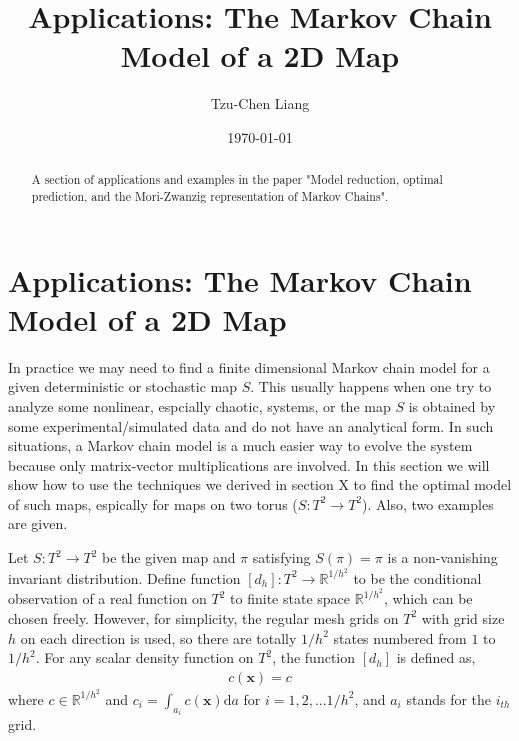 \documentclass{article}
\title{Applications: The Markov Chain Model of a 2D Map}
\author{Tzu-Chen Liang}
\date{\today}
\begin{document}
\maketitle
\begin{abstract}
A section of applications and examples in the paper "Model reduction, optimal prediction, and the Mori-Zwanzig representation of Markov Chains".
\end{abstract}



\section{Applications: The Markov Chain Model of a 2D Map}

In practice we may need to find a finite dimensional Markov chain model for a given deterministic or stochastic map $S$. This usually happens when one try to analyze some nonlinear, espcially chaotic, systems, or the map $S$ is obtained by some experimental/simulated data and do not have an analytical form. In such situations, a Markov chain model is a much easier way to evolve the system because only matrix-vector multiplications are involved. In this section we will show how to use the techniques we derived in section X to find the optimal model of such maps, espically for maps on two torus ($S: T^2 \rightarrow T^2$). Also, two examples are given.    


Let $S:T^2 \rightarrow T^2$ be the given map and $\pi$ satisfying $S(\pi)=\pi$ is a non-vanishing invariant distribution. Define function $[d_h]: T^2 \rightarrow \mathbb{R}^{1/h^2}$ to be the conditional observation of a real function on $T^2$ to finite state space $\mathbb{R}^{1/h^2}$, which can be chosen freely. However, for simplicity, the regular mesh grids on $T^2$ with grid size $h$ on each direction is used, so there are totally $1/h^2$ states numbered from $1$ to $1/h^2$. For any scalar density function on $T^2$, the function $[d_h]$ is defined as,
\begin{eqnarray}
[d_h]c(\mathbf{x}) = c
\end{eqnarray}
where $c\in \mathbb{R}^{1/h^2}$ and $c_i = \int_{a_i} c(\mathbf{x}) \text{d}a$ for $i = 1,2,...1/h^2$, and $a_i$ stands for the $i_{th}$ grid. 
\end{document}
